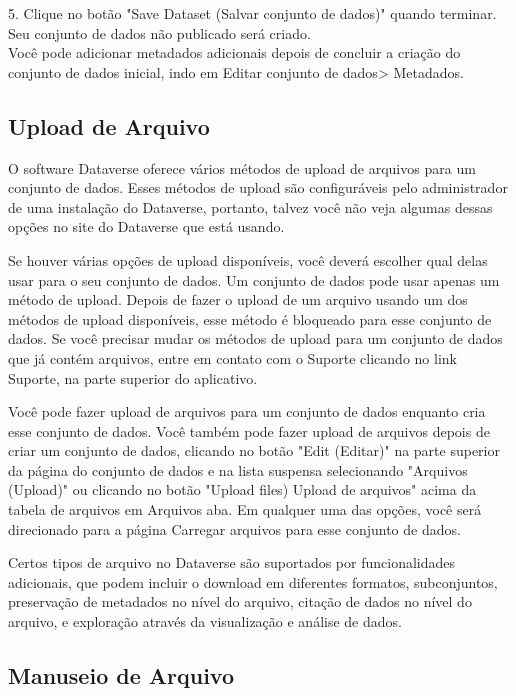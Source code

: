 \documentclass[12pt,hidelinks]{article}
\begin{document}
5. Clique no botão "Save Dataset (Salvar conjunto de dados)" quando terminar. Seu conjunto de dados não publicado será criado.\\

Você pode adicionar metadados adicionais depois de concluir a criação do conjunto de dados inicial, indo em Editar conjunto de dados> Metadados.

    
    \subsection{Upload de Arquivo}
    
\qquad O software Dataverse oferece vários métodos de upload de arquivos para um conjunto de dados. Esses métodos de upload são configuráveis pelo administrador de uma instalação do Dataverse, portanto, talvez você não veja algumas dessas opções no site do Dataverse que está usando.

Se houver várias opções de upload disponíveis, você deverá escolher qual delas usar para o seu conjunto de dados. Um conjunto de dados pode usar apenas um método de upload. Depois de fazer o upload de um arquivo usando um dos métodos de upload disponíveis, esse método é bloqueado para esse conjunto de dados. Se você precisar mudar os métodos de upload para um conjunto de dados que já contém arquivos, entre em contato com o Suporte clicando no link Suporte, na parte superior do aplicativo.

Você pode fazer upload de arquivos para um conjunto de dados enquanto cria esse conjunto de dados. Você também pode fazer upload de arquivos depois de criar um conjunto de dados, clicando no botão "Edit (Editar)" na parte superior da página do conjunto de dados e na lista suspensa selecionando "Arquivos (Upload)" ou clicando no botão "Upload files) Upload de arquivos" acima da tabela de arquivos em Arquivos aba. Em qualquer uma das opções, você será direcionado para a página Carregar arquivos para esse conjunto de dados.

Certos tipos de arquivo no Dataverse são suportados por funcionalidades adicionais, que podem incluir o download em diferentes formatos, subconjuntos, preservação de metadados no nível do arquivo, citação de dados no nível do arquivo, e exploração através da visualização e análise de dados.
    
    \subsection{Manuseio de Arquivo}
    
\end{document}
